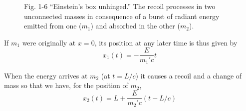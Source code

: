 \begin{figure}[h]
    \caption*{Fig. 1-6 ``Einstein's box unhinged.'' The recoil processes in two unconnected masses in consequence of a burst of radiant energy emitted from one ($m_1$) and absorbed in the other ($m_2$).}
\end{figure}

If $m_1$ were originally at $x = 0$, its position at any later time is thus given by
\begin{equation}
    x_1(t) = - \frac{E}{m_1' c} t \tag{1-30}
\end{equation}

When the energy arrives at $m_2$ (at $t = L/c$) it causes a recoil and a change of mass so that we have, for the position of $m_2$,
\begin{equation}
    x_2(t) = L + \frac{E}{m_2' c} (t - L/c) \tag{1-31}
\end{equation}

